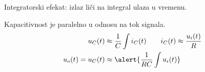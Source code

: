 \begin{frame}[label=08-s054]
\setlength{\parskip}{2pt}
\setlength{\abovedisplayskip}{4pt}\setlength{\belowdisplayskip}{4pt}
\begin{columns}[c,onlytextwidth]
\centering
{}\centering
\end{columns}\medskip
\alert{Integratorski efekat}: izlaz liči na integral ulaza u vremenu.\par
Kapacitivnost je paralelno u odnosu na tok signala.
\begin{align*}
u_C(t)&\approx\frac1C\int i_C(t)\qquad i_C(t)\approx\frac{u_i(t)}R\\
u_o(t)=u_C(t)&\approx\alert{\frac1{RC}\int u_i(t)}
\end{align*}
\end{frame}
